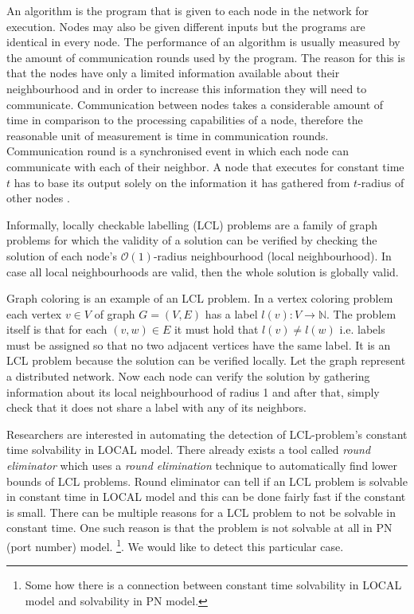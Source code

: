 An algorithm is the program that is given to each node in the network for execution.
Nodes may also be given different inputs but the programs are identical in every node.
The performance of an algorithm is usually measured by the amount of communication rounds used by the program.
The reason for this is that the nodes have only a limited information available about their neighbourhood and in order to increase this information they will need to communicate.
Communication between nodes takes a considerable amount of time in comparison to the processing capabilities of a node, therefore the reasonable unit of measurement is time in communication rounds.
Communication round is a synchronised event in which each node can communicate with each of their neighbor.
A node that executes for constant time $t$ has to base its output solely on the information it has gathered from $t$-radius of other nodes
\cite{DBLP:journals/siamcomp/NaorS95}.

Informally, locally checkable labelling (LCL) problems are a family of graph problems for which the validity of a solution can be verified by checking the solution of each node's $\mathcal{O}(1)$-radius neighbourhood (local neighbourhood).
In case all local neighbourhoods are valid, then the whole solution is globally valid.
\cite{DBLP:conf/podc/BrandtHKLOPRSU17}

Graph coloring is an example of an LCL problem.
In a vertex coloring problem each vertex $v \in V$ of graph $G = (V, E)$ has a label $l(v): V \rightarrow \mathbb{N}$.
The problem itself is that for each $(v, w) \in E$ it must hold that $l(v) \neq l(w)$ i.e. labels must be assigned so that no two adjacent vertices have the same label.
It is an LCL problem because the solution can be verified locally.
Let the graph represent a distributed network.
Now each node can verify the solution by gathering information about its local neighbourhood of radius 1 and after that, simply check that it does not share a label with any of its neighbors.

Researchers are interested in automating the detection of LCL-problem's constant time solvability in LOCAL model.
There already exists a tool called \emph{round eliminator} \cite{DBLP:conf/podc/Olivetti20} which uses a \emph{round elimination} \cite{DBLP:conf/podc/Brandt19} technique to automatically find lower bounds of LCL problems.
Round eliminator can tell if an LCL problem is solvable in constant time in LOCAL model and this can be done fairly fast if the constant is small.%
There can be multiple reasons for a LCL problem to not be solvable in constant time.
One such reason is that the problem is not solvable at all in PN (port number) model.
\footnote{Some how there is a connection between constant time solvability in LOCAL model and solvability in PN model.}.
We would like to detect this particular case.


